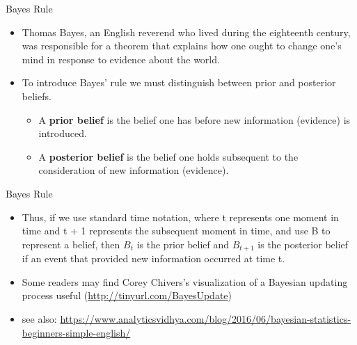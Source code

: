 \documentclass[
  ignorenonframetext,
]{beamer}
\providecommand{\tightlist}{%
  \setlength{\itemsep}{0pt}\setlength{\parskip}{0pt}}
\begin{document}
\begin{frame}{Bayes Rule}
\protect\hypertarget{bayes-rule}{}

\begin{itemize}
\item
  Thomas Bayes, an English reverend who lived during the eighteenth
  century, was responsible for a theorem that explains how one ought to
  change one's mind in response to evidence about the world.
\item
  To introduce Bayes' rule we must distinguish between prior and
  posterior beliefs.

  \begin{itemize}
  \tightlist
  \item
    A \textbf{prior belief} is the belief one has before new information
    (evidence) is introduced.
  \item
    A \textbf{posterior belief} is the belief one holds subsequent to
    the consideration of new information (evidence).
  \end{itemize}
\end{itemize}

\end{frame}

\begin{frame}{Bayes Rule}
\protect\hypertarget{bayes-rule-1}{}

\begin{itemize}
\item
  Thus, if we use standard time notation, where t represents one moment
  in time and t + 1 represents the subsequent moment in time, and use B
  to represent a belief, then \(B_{t}\) is the prior belief and
  \(B_{t+1}\) is the posterior belief if an event that provided new
  information occurred at time t.
\item
  Some readers may find Corey Chivers's visualization of a Bayesian
  updating process useful (\url{http://tinyurl.com/BayesUpdate})
\item
  see also:
  \url{https://www.analyticsvidhya.com/blog/2016/06/bayesian-statistics-beginners-simple-english/}
\end{itemize}

\end{frame}
\end{document}

